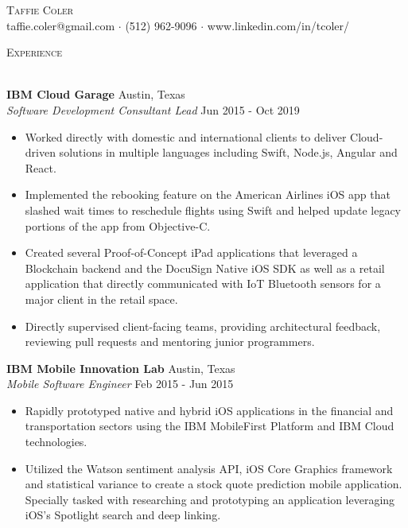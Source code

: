 \documentclass[a4paper]{article}
\newcommand{\lineunder} {
    \vspace*{-8pt} \\
    \hspace*{-18pt} \hrulefill \\
}
\newcommand{\header} [1] {
    {\hspace*{-18pt}\vspace*{6pt} \textsc{#1}}
    \vspace*{-6pt} \lineunder
}
\begin{document}
\vspace*{-40pt}

    

\vspace*{-10pt}
\begin{center}
	{\Huge \scshape {Taffie Coler}}\\
	taffie.coler@gmail.com $\cdot$ (512) 962-9096 $\cdot$ www.linkedin.com/in/tcoler/\\
\end{center}

\header{Experience}
\vspace{1mm}

\textbf{IBM Cloud Garage} \hfill Austin, Texas\\
\textit{Software Development Consultant Lead} \hfill Jun 2015 - Oct 2019\\
\vspace{-1mm}
\begin{itemize} \itemsep 1pt
	\item Worked directly with domestic and international clients to deliver Cloud-driven solutions in multiple languages including Swift, Node.js, Angular and React.
	\item Implemented the rebooking feature on the American Airlines iOS app that slashed wait times to reschedule flights using Swift and helped update legacy portions of the app from Objective-C. 
	\item Created several Proof-of-Concept iPad applications that leveraged a Blockchain backend and the DocuSign Native iOS SDK as well as a retail application that directly communicated with IoT Bluetooth sensors for a major client in the retail space.
	\item Directly supervised client-facing teams, providing architectural feedback, reviewing pull requests and mentoring junior programmers.
\end{itemize}
\vspace{2mm}
\textbf{IBM Mobile Innovation Lab} \hfill Austin, Texas\\
\textit{Mobile Software Engineer} \hfill Feb 2015 - Jun 2015\\
\vspace{-1mm}
\begin{itemize} \itemsep 1pt
	\item Rapidly prototyped native and hybrid iOS applications in the financial and transportation sectors using the IBM MobileFirst Platform and IBM Cloud technologies. 
	\item Utilized the Watson sentiment analysis API, iOS Core Graphics framework and statistical variance to create a stock quote prediction mobile application. Specially tasked with researching and prototyping an application leveraging iOS’s Spotlight search and deep linking.
\end{itemize}
\end{document}
